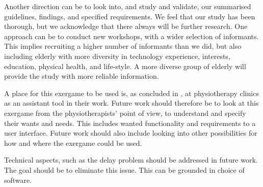 Another direction can be to look into, and study and validate, our summarised guidelines, findings, and specified requirements. We feel that our study has been thorough, but we acknowledge that there always will be further research. One approach can be to conduct new workshops, with a wider selection of informants. This implies recruiting a higher number of informants than we did, but also including elderly with more diversity in technology experience, interests, education, physical health, and life-style. A more diverse group of elderly will provide the study with more reliable information.   

A place for this exergame to be used is, as concluded in \cite{project}, at physiotherapy clinics as an assistant tool in their work. Future work should therefore be to look at this exergame from the physiotherapists' point of view, to understand and specify their wants and needs. This includes wanted functionality and requirements to a user interface. Future work should also include looking into other possibilities for how and where the exergame could be used.   

Technical aspects, such as the delay problem should be addressed in future work. The goal should be to eliminate this issue. This can be grounded in choice of software. 
